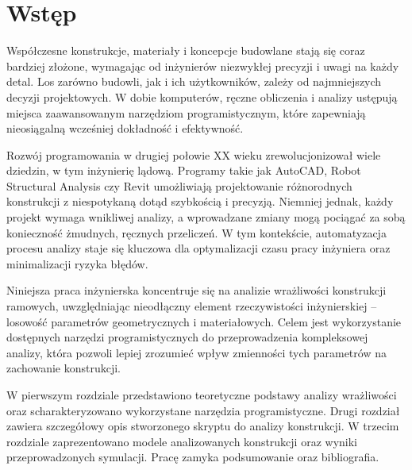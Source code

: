 \section{Wstęp}

Współczesne konstrukcje, materiały i koncepcje budowlane stają się coraz bardziej złożone, wymagając od inżynierów niezwykłej precyzji i uwagi na każdy detal.
Los zarówno budowli, jak i ich użytkowników, zależy od najmniejszych decyzji projektowych.
W dobie komputerów, ręczne obliczenia i analizy ustępują miejsca zaawansowanym narzędziom programistycznym, które zapewniają nieosiągalną wcześniej dokładność i efektywność.

Rozwój programowania w drugiej połowie XX wieku zrewolucjonizował wiele dziedzin, w tym inżynierię lądową.
Programy takie jak AutoCAD, Robot Structural Analysis czy Revit umożliwiają projektowanie różnorodnych konstrukcji z niespotykaną dotąd szybkością i precyzją.
Niemniej jednak, każdy projekt wymaga wnikliwej analizy, a wprowadzane zmiany mogą pociągać za sobą konieczność żmudnych, ręcznych przeliczeń.
W tym kontekście, automatyzacja procesu analizy staje się kluczowa dla optymalizacji czasu pracy inżyniera oraz minimalizacji ryzyka błędów.

Niniejsza praca inżynierska koncentruje się na analizie wrażliwości konstrukcji ramowych, uwzględniając nieodłączny element rzeczywistości inżynierskiej – losowość parametrów geometrycznych i materiałowych.
Celem jest wykorzystanie dostępnych narzędzi programistycznych do przeprowadzenia kompleksowej analizy, która pozwoli lepiej zrozumieć wpływ zmienności tych parametrów na zachowanie konstrukcji.

W pierwszym rozdziale przedstawiono teoretyczne podstawy analizy wrażliwości oraz scharakteryzowano wykorzystane narzędzia programistyczne.
Drugi rozdział zawiera szczegółowy opis stworzonego skryptu do analizy konstrukcji.
W trzecim rozdziale zaprezentowano modele analizowanych konstrukcji oraz wyniki przeprowadzonych symulacji.
Pracę zamyka podsumowanie oraz bibliografia.
